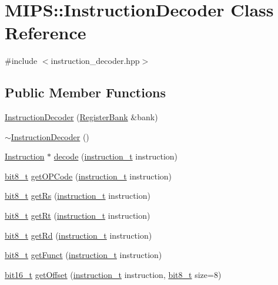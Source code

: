 \hypertarget{classMIPS_1_1InstructionDecoder}{}\section{M\+I\+PS\+:\+:Instruction\+Decoder Class Reference}
\label{classMIPS_1_1InstructionDecoder}


{\ttfamily \#include $<$instruction\+\_\+decoder.\+hpp$>$}

\subsection*{Public Member Functions}
\begin{DoxyCompactItemize}
\item 
\hyperlink{classMIPS_1_1InstructionDecoder_a81c1e3f43edf65ca86dba43a9090c9fc}{Instruction\+Decoder} (\hyperlink{classMIPS_1_1RegisterBank}{Register\+Bank} \&bank)
\item 
\hyperlink{classMIPS_1_1InstructionDecoder_a148a38deb0745a55bbd927d186f93c89}{$\sim$\+Instruction\+Decoder} ()
\item 
\hyperlink{classMIPS_1_1Instruction}{Instruction} $\ast$ \hyperlink{classMIPS_1_1InstructionDecoder_adf51f7da13d3256b60d99384cdc4af63}{decode} (\hyperlink{core_8hpp_aa514fd240a0e29abb2a2e4c805d7f1a4}{instruction\+\_\+t} instruction)
\item 
\hyperlink{core_8hpp_a6074bae122ae7b527864eec42c728c3c}{bit8\+\_\+t} \hyperlink{classMIPS_1_1InstructionDecoder_a9ba2a37411b5e8d4e7b03c4d5b50399b}{get\+O\+P\+Code} (\hyperlink{core_8hpp_aa514fd240a0e29abb2a2e4c805d7f1a4}{instruction\+\_\+t} instruction)
\item 
\hyperlink{core_8hpp_a6074bae122ae7b527864eec42c728c3c}{bit8\+\_\+t} \hyperlink{classMIPS_1_1InstructionDecoder_a557dfb2243be5d1a0a369c333817fa86}{get\+Rs} (\hyperlink{core_8hpp_aa514fd240a0e29abb2a2e4c805d7f1a4}{instruction\+\_\+t} instruction)
\item 
\hyperlink{core_8hpp_a6074bae122ae7b527864eec42c728c3c}{bit8\+\_\+t} \hyperlink{classMIPS_1_1InstructionDecoder_a4da42498cc12ddcc041b42bacbc3b3a1}{get\+Rt} (\hyperlink{core_8hpp_aa514fd240a0e29abb2a2e4c805d7f1a4}{instruction\+\_\+t} instruction)
\item 
\hyperlink{core_8hpp_a6074bae122ae7b527864eec42c728c3c}{bit8\+\_\+t} \hyperlink{classMIPS_1_1InstructionDecoder_a493aeaf3390fb5821596ef3efc22e65b}{get\+Rd} (\hyperlink{core_8hpp_aa514fd240a0e29abb2a2e4c805d7f1a4}{instruction\+\_\+t} instruction)
\item 
\hyperlink{core_8hpp_a6074bae122ae7b527864eec42c728c3c}{bit8\+\_\+t} \hyperlink{classMIPS_1_1InstructionDecoder_aa7148e0ad81662725be7203837a4e46c}{get\+Funct} (\hyperlink{core_8hpp_aa514fd240a0e29abb2a2e4c805d7f1a4}{instruction\+\_\+t} instruction)
\item 
\hyperlink{core_8hpp_adc265a970bc35995b5879784bbb3f1b7}{bit16\+\_\+t} \hyperlink{classMIPS_1_1InstructionDecoder_a09ba48d5683432c3a303b8c42367755f}{get\+Offset} (\hyperlink{core_8hpp_aa514fd240a0e29abb2a2e4c805d7f1a4}{instruction\+\_\+t} instruction, \hyperlink{core_8hpp_a6074bae122ae7b527864eec42c728c3c}{bit8\+\_\+t} size=8)
\end{DoxyCompactItemize}
